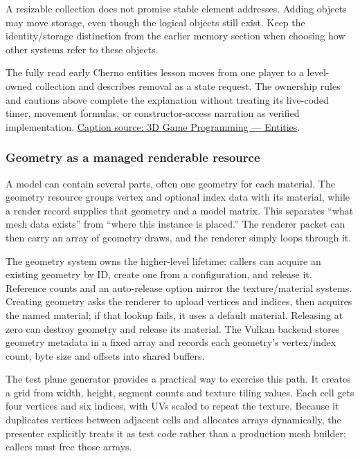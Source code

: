 A resizable collection does not promise stable element addresses. Adding objects may move storage, even though the logical objects still exist. Keep the identity/storage distinction from the earlier memory section when choosing how other systems refer to these objects.

The fully read early Cherno entities lesson moves from one player to a level-owned collection and describes removal as a state request. The ownership rules and cautions above complete the explanation without treating its live-coded timer, movement formulas, or constructor-access narration as verified implementation. \href{https://www.youtube.com/watch?v=J3wfaJk_IMw}{Caption source: 3D Game Programming --- Entities}.

\subsubsection{Geometry as a managed renderable resource}\label{06-engine-ii-ch031-geometry-as-a-managed-renderable-resource}

A model can contain several parts, often one geometry for each material. The geometry resource groups vertex and optional index data with its material, while a render record supplies that geometry and a model matrix. This separates ``what mesh data exists'' from ``where this instance is placed.'' The renderer packet can then carry an array of geometry draws, and the renderer simply loops through it.

The geometry system owns the higher-level lifetime: callers can acquire an existing geometry by ID, create one from a configuration, and release it. Reference counts and an auto-release option mirror the texture/material systems. Creating geometry asks the renderer to upload vertices and indices, then acquires the named material; if that lookup fails, it uses a default material. Releasing at zero can destroy geometry and release its material. The Vulkan backend stores geometry metadata in a fixed array and records each geometry's vertex/index count, byte size and offsets into shared buffers.

The test plane generator provides a practical way to exercise this path. It creates a grid from width, height, segment counts and texture tiling values. Each cell gets four vertices and six indices, with UVs scaled to repeat the texture. Because it duplicates vertices between adjacent cells and allocates arrays dynamically, the presenter explicitly treats it as test code rather than a production mesh builder; callers must free those arrays.

